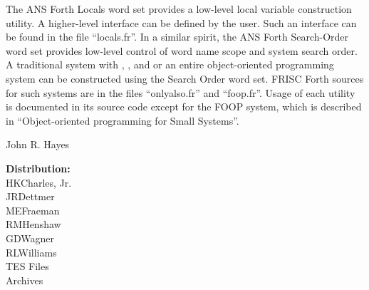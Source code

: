 The ANS Forth Locals word set provides a low-level local variable
construction utility.  A higher-level interface can be defined by the
user.  Such an interface can be found in the file ``locals.fr''.
In a similar spirit, the ANS Forth
Search-Order word set
provides low-level control of word name scope and system search order.
A traditional  system with , ,
and  or an entire object-oriented programming system
can be constructed using the Search Order word set.  FRISC Forth
sources for such systems are in the files ``onlyalso.fr'' and
``foop.fr''.
Usage of each utility is documented in its source code except for
the FOOP system, which is described in
``Object-oriented programming for Small Systems''.

\vspace{1in}
\hspace{4in}John R. Hayes

\begin{flushleft}
{\bf Distribution:} \\
HKCharles, Jr. \\
JRDettmer \\
MEFraeman \\
RMHenshaw \\
GDWagner \\
RLWilliams \\
TES Files \\
Archives \\
\end{flushleft}


